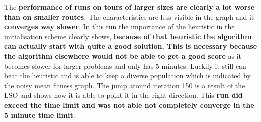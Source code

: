 \documentclass[a4paper,10pt]{article}
\begin{document}
The \textbf{performance of runs on tours of larger sizes are clearly a lot worse than on smaller routes}. The characteristics are less visible in the graph and it \textbf{converges way slower}. In this run the importance of the heuristic in the initialisation scheme clearly shows, \textbf{because of that heuristic the algorithm can actually start with quite a good solution. This is necessary because the algorithm elsewhere would not be able to get a good score} as it becomes slower for larger problems and only has 5 minutes. Luckily it still can beat the heuristic and is able to keep a diverse population which is indicated by the noisy mean fitness graph. The jump around iteration 150 is a result of the LSO and shows how it is able to point it in the right direction. This \textbf{run did exceed the time limit and was not able not completely converge in the 5 minute time limit}.
\end{document}
